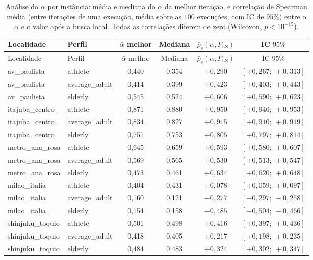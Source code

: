\documentclass[11pt,a4paper]{article}
\begin{document}
\renewcommand{\arraystretch}{1.15}
\begin{longtable}{@{}l l c c c c@{}}
\caption{Análise do $\alpha$ por instância: média e mediana do $\alpha$ da melhor iteração, e correlação de Spearman média (entre iterações de uma execução, média sobre as $100$ execuções, com IC de $95\%$) entre o $\alpha$ e o valor após a busca local. Todas as correlações diferem de zero (Wilcoxon, $p<10^{-15}$).}\label{tab:grasp-alpha}\\
\toprule
Localidade & Perfil & $\bar{\alpha}$ melhor & Mediana & $\bar{\rho}_s(\alpha, F_{\text{LS}})$ & IC $95\%$ \\
\midrule
\endfirsthead
\toprule
Localidade & Perfil & $\bar{\alpha}$ melhor & Mediana & $\bar{\rho}_s(\alpha, F_{\text{LS}})$ & IC $95\%$ \\
\midrule
\endhead
av\_paulista & athlete & 0,440 & 0,354 & $+0{,}290$ & $[+0{,}267;\ +0{,}313]$ \\
av\_paulista & average\_adult & 0,414 & 0,399 & $+0{,}423$ & $[+0{,}403;\ +0{,}443]$ \\
av\_paulista & elderly & 0,545 & 0,524 & $+0{,}606$ & $[+0{,}590;\ +0{,}623]$ \\
itajuba\_centro & athlete & 0,871 & 0,880 & $+0{,}950$ & $[+0{,}946;\ +0{,}953]$ \\
itajuba\_centro & average\_adult & 0,834 & 0,827 & $+0{,}915$ & $[+0{,}910;\ +0{,}919]$ \\
itajuba\_centro & elderly & 0,751 & 0,753 & $+0{,}805$ & $[+0{,}797;\ +0{,}814]$ \\
metro\_ana\_rosa & athlete & 0,645 & 0,659 & $+0{,}593$ & $[+0{,}580;\ +0{,}607]$ \\
metro\_ana\_rosa & average\_adult & 0,569 & 0,565 & $+0{,}530$ & $[+0{,}513;\ +0{,}547]$ \\
metro\_ana\_rosa & elderly & 0,473 & 0,461 & $+0{,}634$ & $[+0{,}620;\ +0{,}648]$ \\
milao\_italia & athlete & 0,404 & 0,431 & $+0{,}078$ & $[+0{,}059;\ +0{,}097]$ \\
milao\_italia & average\_adult & 0,160 & 0,121 & $-0{,}277$ & $[-0{,}297;\ -0{,}258]$ \\
milao\_italia & elderly & 0,154 & 0,158 & $-0{,}485$ & $[-0{,}504;\ -0{,}466]$ \\
shinjuku\_toquio & athlete & 0,501 & 0,498 & $+0{,}416$ & $[+0{,}397;\ +0{,}436]$ \\
shinjuku\_toquio & average\_adult & 0,418 & 0,405 & $+0{,}217$ & $[+0{,}198;\ +0{,}235]$ \\
shinjuku\_toquio & elderly & 0,484 & 0,483 & $+0{,}324$ & $[+0{,}302;\ +0{,}347]$ \\
\bottomrule
\end{longtable}
\end{document}

